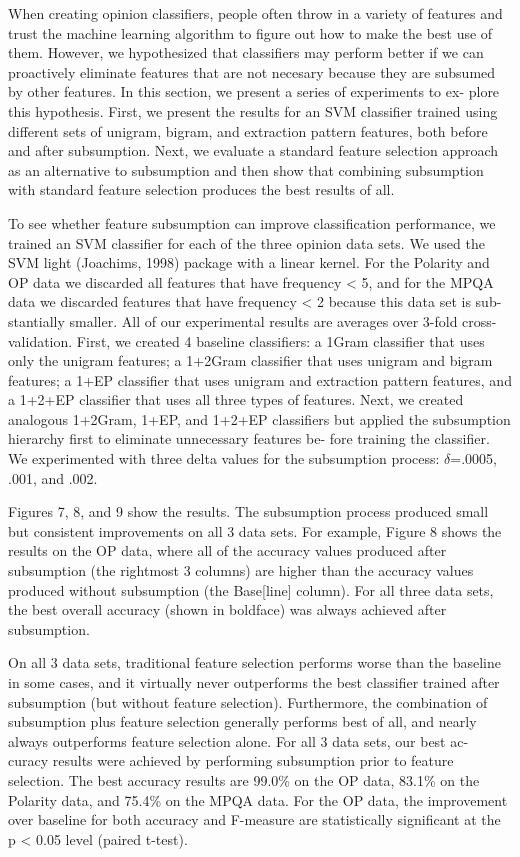 When creating opinion classifiers, people often throw in a variety of
features and trust the machine learning algorithm to figure out how
to make the best use of them. However, we hypothesized that
classifiers may perform better if we can proactively eliminate
features that are not necesary because they are subsumed by other
features. In this section, we present a series of experiments to ex-
plore this hypothesis. First, we present the results for an SVM
classifier trained using different sets of unigram, bigram, and
extraction pattern features, both before and after
subsumption. Next, we evaluate a standard feature selection approach
as an alternative to subsumption and then show that combining
subsumption with standard feature selection produces the best
results of all.

To see whether feature subsumption can improve classification
performance, we trained an SVM classifier for each of the three
opinion data sets.  We used the SVM light (Joachims, 1998) package
with a linear kernel. For the Polarity and OP data we discarded all
features that have frequency < 5, and for the MPQA data we discarded
features that have frequency < 2 because this data set is sub-
stantially smaller. All of our experimental results are averages over
3-fold cross-validation.  First, we created 4 baseline classifiers: a
1Gram classifier that uses only the unigram features; a 1+2Gram
classifier that uses unigram and bigram features; a 1+EP classifier
that uses unigram and extraction pattern features, and a 1+2+EP
classifier that uses all three types of features. Next, we created
analogous 1+2Gram, 1+EP, and 1+2+EP classifiers but applied the
subsumption hierarchy first to eliminate unnecessary features be-
fore training the classifier. We experimented with three delta values
for the subsumption process: $\delta$=.0005, .001, and .002.

Figures 7, 8, and 9 show the results. The subsumption process
produced small but consistent improvements on all 3 data sets. For
example, Figure 8 shows the results on the OP data, where all of the
accuracy values produced after subsumption (the rightmost 3 columns)
are higher than the accuracy values produced without subsumption
(the Base[line] column). For all three data sets, the best overall
accuracy (shown in boldface) was always achieved after subsumption.

On all 3 data sets, traditional feature selection performs worse than
the baseline in some cases, and it virtually never outperforms the
best classifier trained after subsumption (but without feature
selection). Furthermore, the combination of subsumption plus feature
selection generally performs best of all, and nearly always
outperforms feature selection alone. For all 3 data sets, our best ac-
curacy results were achieved by performing subsumption prior to
feature selection. The best accuracy results are 99.0\% on the OP
data, 83.1\% on the Polarity data, and 75.4\% on the MPQA data.  For
the OP data, the improvement over baseline for both accuracy and
F-measure are statistically significant at the p < 0.05 level (paired
t-test).


